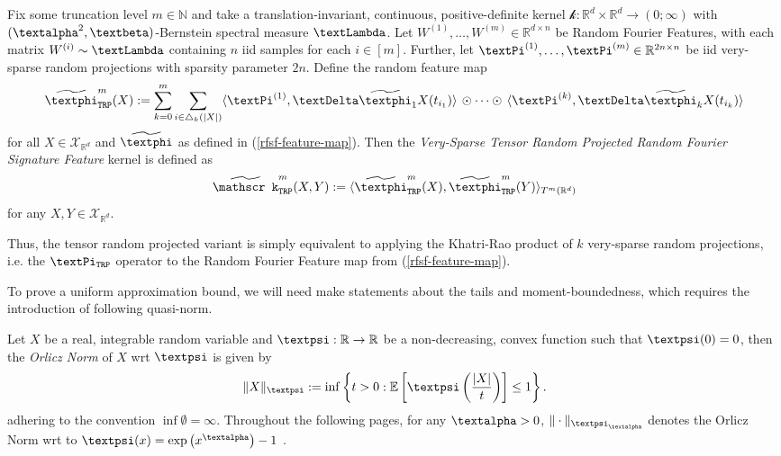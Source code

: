 \documentclass[openany]{book}
\begin{document}
\begin{definition}\label{rfsf-trp-def}
    Fix some truncation level $m\in \mathbb N$ and take a translation-invariant, continuous, positive-definite kernel $\mathscr k:\mathbb R^d\times \mathbb R^d\to (0;\infty)$ with $(\galpha^2, \gbeta)$-Bernstein spectral measure $\gLambda$. Let $W^{(1)}, \dots,W^{(m)}\in \mathbb R^{d\times n}$ be Random Fourier Features, with each matrix $W^{(i)}\sim \gLambda$ containing $n$ iid samples for each $i\in [m]$. Further, let $\gPi^{(1)},\dots,\gPi^{(m)}\in \mathbb R^{2n\times n}$ be iid very-sparse random projections with sparsity parameter $2n$. Define the random feature map
    \begin{equation*}
        \widetilde{\gphi}^m_{\mathtt{TRP}}(X):=\sum_{k=0}^m\sum_{i\in \triangle_k(\vert X\vert )}\langle \gPi^{(1)},\gDelta\widetilde{\gphi}_1{X(t_{i_1})} \rangle \,\odot \cdots \odot\,\langle \gPi^{(k)},\gDelta\widetilde{\gphi}_k{X(t_{i_k})} \rangle 
    \end{equation*}
    for all $X\in \mathscr X_{\mathbb R^d}$ and $\widetilde{\gphi}$ as defined in (\ref{rfsf-feature-map}). Then the \textit{Very-Sparse Tensor Random Projected Random Fourier Signature Feature} kernel is defined as 
    \begin{equation*}
        \widetilde{\mathscr k}^m_{\mathtt{TRP}}(X,Y):=\langle \widetilde{\gphi}^m_{\mathtt{TRP}}(X), \widetilde{\gphi}^m_{\mathtt{TRP}}(Y)\rangle_{T^{m}(\mathbb R^d)}
    \end{equation*}
    for any $X,Y\in \mathscr X_{\mathbb R^d}$.
\end{definition}
Thus, the tensor random projected variant is simply equivalent to applying the Khatri-Rao product of $k$ very-sparse random projections, i.e. the $\gPi_{\mathtt{TRP}}$ operator to the Random Fourier Feature map from (\ref{rfsf-feature-map}). 
\par To prove a uniform approximation bound, we will need make statements about the tails and moment-boundedness, which requires the introduction of following quasi-norm.
\begin{definition}\label{orlicz-norm}
    Let $X$ be a real, integrable random variable and $\gpsi:\mathbb R\to \mathbb R$ be a non-decreasing, convex function such that $\gpsi(0)=0$, then the \textit{Orlicz Norm} of $X$ wrt $\gpsi$ is given by
    \begin{equation}\label{orlicz-norm-eq}
        \|X\|_{\gpsi}:=\inf\left\{t>0:\mathbb E\left[\gpsi\left(\frac{\vert X\vert }{t}\right)\right]\leq 1\right\}.
    \end{equation}
    adhering to the convention $\inf \emptyset =\infty$. Throughout the following pages, for any $\galpha > 0$, $\|\cdot \|_{\gpsi_{\galpha}}$ denotes the Orlicz Norm wrt to $\gpsi(x)=\exp\left(x^{\galpha}\right)-1$ \cite{toth2025}.
\end{definition}
\end{document}
